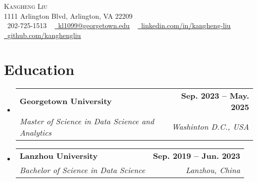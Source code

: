 \documentclass[letterpaper,11pt]{article}
\makeatletter
\newcommand{\resumeSubheading}[4]{
  \vspace{-2pt}\item
    \begin{tabular*}{1.0\textwidth}[t]{l@{\extracolsep{\fill}}r}
      \textbf{#1} & \textbf{\small #2} \\
      \textit{\small#3} & \textit{\small #4} \\
    \end{tabular*}\vspace{-7pt}
}
\newcommand{\resumeSubHeadingListStart}{\begin{itemize}[leftmargin=0.0in, label={}]}
\newcommand{\resumeSubHeadingListEnd}{\end{itemize}}
\makeatother
\begin{document}

\begin{center}
    {\Huge \scshape Kangheng Liu} \\ \vspace{1pt}
    1111 Arlington Blvd, Arlington, VA 22209 \\ \vspace{1pt}
    \small \raisebox{-0.1\height}\faPhone\ 202-725-1513 ~ \href{mailto:kl1099@georgetown.edu}{\raisebox{-0.2\height}\faEnvelope\  \underline{kl1099@georgetown.edu}} ~
    \href{https://www.linkedin.com/in/kangheng-liu-7a5754295/}{\raisebox{-0.2\height}\faLinkedin\ \underline{linkedin.com/in/kangheng-liu}}  ~
    \href{https://github.com/kanghengliu}{\raisebox{-0.2\height}\faGithub\ \underline{github.com/kanghengliu}}
    \vspace{-8pt}
\end{center}


\section{Education}
  \resumeSubHeadingListStart
    \resumeSubheading
      {Georgetown University}{Sep. 2023 -- May. 2025}
      {Master of Science in Data Science and Analytics}{Washinton D.C., USA}
    \resumeSubheading
      {Lanzhou University}{Sep. 2019 -- Jun. 2023}
      {Bachelor of Science in Data Science}{Lanzhou, China}
  \resumeSubHeadingListEnd
\end{document}
